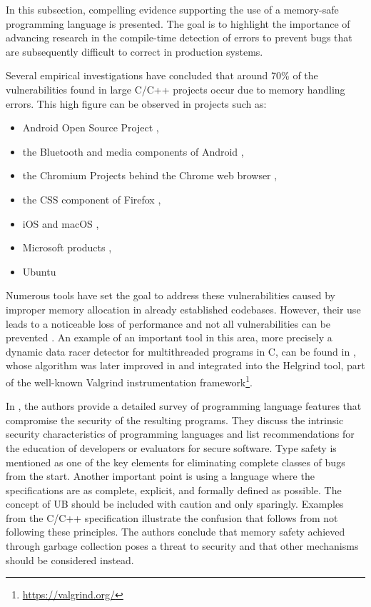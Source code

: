 In this subsection, compelling evidence supporting
the use of a memory-safe programming language is presented.
The goal is to highlight the importance of advancing research in the compile-time detection of errors
to prevent bugs that are subsequently difficult to correct in production systems.

Several empirical investigations have concluded that around 70\% of the vulnerabilities
found in large C/C++ projects occur due to memory handling errors.
This high figure can be observed in projects such as:

\begin{itemize}
      \item Android Open Source Project \cite{memory-bugs-android},
      \item the Bluetooth and media components of Android \cite{memory-bugs-android-media-bluetooth},
      \item the Chromium Projects behind the Chrome web browser \cite{memory-bugs-chrome},
      \item the CSS component of Firefox \cite{memory-bugs-firefox},
      \item iOS and macOS \cite{memory-bugs-ios-macos},
      \item Microsoft products \cite{miller-security-microsoft2019, memory-bugs-microsoft},
      \item Ubuntu \cite{memory-bugs-ubuntu}
\end{itemize}

Numerous tools have set the goal to address these vulnerabilities
caused by improper memory allocation in already established codebases.
However, their use leads to a noticeable loss of performance and
not all vulnerabilities can be prevented \cite{szekeres2013sok}.
An example of an important tool in this area, more precisely
a dynamic data racer detector for multithreaded programs in C,
can be found in \cite{savage1997eraser},
whose algorithm was later improved in \cite{jannesari2009helgrind+} and
integrated into the Helgrind tool, part of the well-known
Valgrind instrumentation framework\footnote{\url{https://valgrind.org/}}.

In \cite{jaeger2014mind}, the authors provide
a detailed survey of programming language features that
compromise the security of the resulting programs.
They discuss the intrinsic security characteristics of programming languages
and list recommendations for the education of developers or evaluators for secure software.
Type safety is mentioned as one of the key elements
for eliminating complete classes of bugs from the start.
Another important point is using a language where the specifications are
as complete, explicit, and formally defined as possible.
The concept of \acrfull{UB} should be included with caution and only sparingly.
Examples from the C/C++ specification illustrate the confusion
that follows from not following these principles.
The authors conclude that memory safety achieved
through garbage collection poses a threat to security
and that other mechanisms should be considered instead.

